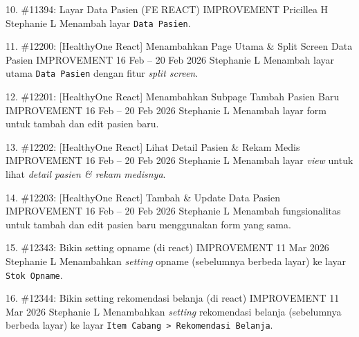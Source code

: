 \begin{tasktable}
    \taskentry
    {10.}
    {
        \#11394: Layar Data Pasien (FE REACT)
    }{IMPROVEMENT}{
        Pricillea H
    }{Stephanie L}{
        Menambah layar \texttt{Data Pasien}.
    }

    \taskentry
    {11.}
    {
        \#12200: [HealthyOne React] Menambahkan Page Utama \& Split Screen Data Pasien
    }{IMPROVEMENT}{
        16 Feb -- 20 Feb 2026
    }{Stephanie L}{
        Menambah layar utama \texttt{Data Pasien} dengan fitur \textit{split screen}.
    }

    \taskentry
    {12.}
    {
        \#12201: [HealthyOne React] Menambahkan Subpage Tambah Pasien Baru
    }{IMPROVEMENT}{
        16 Feb -- 20 Feb 2026
    }{Stephanie L}{
        Menambah layar form untuk tambah dan edit pasien baru.
    }

    \taskentry
    {13.}
    {
        \#12202: [HealthyOne React] Lihat Detail Pasien \& Rekam Medis
    }{IMPROVEMENT}{
        16 Feb -- 20 Feb 2026
    }{Stephanie L}{
        Menambah layar \textit{view} untuk lihat \textit{detail pasien \& rekam medisnya}.
    }

    \taskentry
    {14.}
    {
        \#12203: [HealthyOne React] Tambah \& Update Data Pasien
    }{IMPROVEMENT}{
        16 Feb -- 20 Feb 2026
    }{Stephanie L}{
        Menambah fungsionalitas untuk tambah dan edit pasien baru menggunakan form yang sama.
    }

    \taskentry
    {15.}
    {
        \#12343: Bikin setting opname (di react)
    }{IMPROVEMENT}{
        11 Mar 2026
    }{Stephanie L}{
        Menambahkan \textit{setting} opname (sebelumnya berbeda layar) ke layar \texttt{Stok Opname}.
    }

    \taskentry
    {16.}
    {
        \#12344: Bikin setting rekomendasi belanja (di react)
    }{IMPROVEMENT}{
        11 Mar 2026
    }{Stephanie L}{
        Menambahkan \textit{setting} rekomendasi belanja (sebelumnya berbeda layar) ke layar \texttt{Item Cabang > Rekomendasi Belanja}.
    }
    



\end{tasktable}